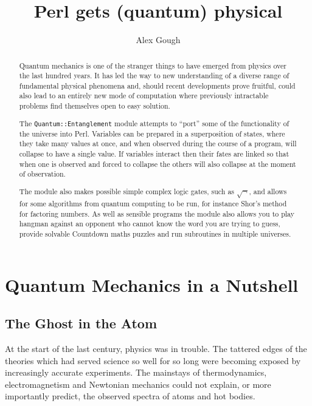 \documentclass{article}      %
\title{\ptt{Quantum::Entanglement} \linebreak Perl gets (quantum) physical}
\author{Alex Gough}
\newcommand{\ptt}[1]{\texttt{#1}}    %
\begin{document}

\maketitle                   %

\begin{abstract}
\noindent
Quantum mechanics is one of the stranger things to have emerged from
physics over the last hundred years.  It has led the way to new
understanding of a diverse range of fundamental physical phenomena
and, should recent developments prove fruitful, could also lead to an
entirely new mode of computation where previously intractable problems
find themselves open to easy solution.

The \ptt{Quantum::Entanglement} module attempts to ``port'' some of the
functionality of the universe into Perl.  Variables can be prepared in
a superposition of states, where they take many values at once, and
when observed during the course of a program, will collapse to have a
single value.  If variables interact then their fates are linked so
that when one is observed and forced to collapse the others will also
collapse at the moment of observation.

The module also makes possible simple complex logic gates, such as
$\sqrt{\neg}$, and allows for some algorithms from quantum
computing to be run, for instance Shor's method for factoring numbers.
As well as sensible programs the module also allows you to play
hangman against an opponent who cannot know the word you are trying to
guess, provide solvable Countdown maths puzzles and run subroutines in
multiple universes.
\end{abstract}

\section{Quantum Mechanics in a Nutshell}

\subsection{The Ghost in the Atom}

At the start of the last century, physics was in
trouble. The tattered edges of the theories which had served science
so well for so long were becoming exposed by increasingly accurate
experiments. The mainstays of thermodynamics, electromagnetism and
Newtonian mechanics could not explain, or more importantly
predict, the observed spectra of atoms and hot bodies.
\end{document}
